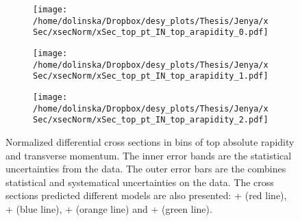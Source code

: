 \begin{figure}[H]
\centering
\begin{subfigure}
  \centering
  \texttt{[image: /home/dolinska/Dropbox/desy\_plots/Thesis/Jenya/xSec/xsecNorm/xSec\_top\_pt\_IN\_top\_arapidity\_0.pdf]}
\end{subfigure}
\begin{subfigure}
  \centering
  \texttt{[image: /home/dolinska/Dropbox/desy\_plots/Thesis/Jenya/xSec/xsecNorm/xSec\_top\_pt\_IN\_top\_arapidity\_1.pdf]}
\end{subfigure}
\begin{subfigure}
  \centering
  \texttt{[image: /home/dolinska/Dropbox/desy\_plots/Thesis/Jenya/xSec/xsecNorm/xSec\_top\_pt\_IN\_top\_arapidity\_2.pdf]}
\end{subfigure}
\caption{Normalized differential cross sections in bins of top absolute rapidity and transverse momentum. The inner error bands are the statistical uncertainties from the data.
         The outer error bars are the combines statistical and systematical uncertainties on the data. The cross sections predicted different models are also presented:
         \MG + \PYTHIA (red line), \Powheg + \PYTHIA (blue line), \Powheg + \HERWIG (orange line) and \MCNLO + \HERWIG (green line).}
\label{fig:XS_2D_y_pt}
\end{figure}
